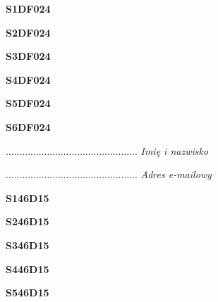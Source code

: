 \begin{turn}{90}\huge \textbf{S1DF024}\end{turn}

\begin{turn}{90}\huge \textbf{S2DF024}\end{turn}

\begin{turn}{90}\huge \textbf{S3DF024}\end{turn}

\begin{turn}{90}\huge \textbf{S4DF024}\end{turn}

\begin{turn}{90}\huge \textbf{S5DF024}\end{turn}

\begin{turn}{90}\huge \textbf{S6DF024}\end{turn}

\begin{turn}{90}\begin{minipage}{\linewidth} \vspace{20mm} ................................................  \textit{Imię i nazwisko}\end{minipage}\end{turn}

\begin{turn}{90}\begin{minipage}{\linewidth} \vspace{20mm} ................................................  \textit{Adres e-mailowy}\end{minipage}\end{turn}

\begin{turn}{90}\huge \textbf{S146D15}\end{turn}

\begin{turn}{90}\huge \textbf{S246D15}\end{turn}

\begin{turn}{90}\huge \textbf{S346D15}\end{turn}

\begin{turn}{90}\huge \textbf{S446D15}\end{turn}

\begin{turn}{90}\huge \textbf{S546D15}\end{turn}

